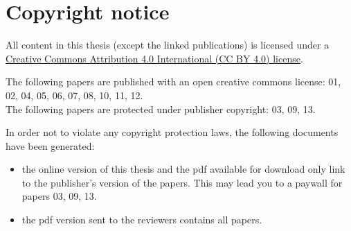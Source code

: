 \section*{Copyright notice}

All content in this thesis (except the linked publications) is licensed 
under a \href{https://creativecommons.org/licenses/by/4.0}{Creative Commons Attribution 4.0 International (CC BY 4.0) license}.

The following papers are published with an open creative commons license:
01, 02, 04, 05, 06, 07, 08, 10, 11, 12. \\
The following papers are protected under publisher copyright: 03, 09, 13.

In order not to violate any copyright protection laws, the following documents have been generated:
\begin{itemize}[nosep]
\item the online version of this thesis and the pdf available for download only link to the publisher's 
      version of the papers. This may lead you to a paywall for papers 03, 09, 13.
\item the pdf version sent to the reviewers contains all papers.
\end{itemize}
